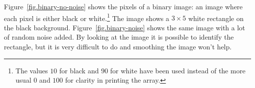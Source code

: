 Figure~\ref{fig.binary-no-noise} shows the pixels of a binary image: an image where each pixel is either black or white.\footnote{The values $10$ for black and $90$ for white have been used instead of the more usual $0$ and $100$ for clarity in printing the array.} The image shows a $3\times 5$ white rectangle on the black background. Figure~\ref{fig.binary-noise} shows the same image with a lot of random noise added. By looking at the image it is possible to identify the rectangle, but it is very difficult to do and smoothing the image won't help.

\begin{figure}
\subfigures
\begin{minipage}{\textwidth}
\hspace{\fill}

\end{minipage}
\end{figure}
